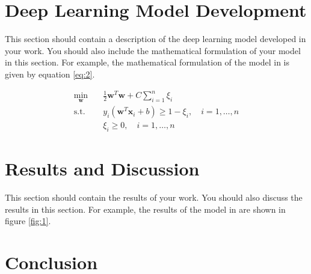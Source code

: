 \documentclass[lettersize, journal]{IEEEtran}
\begin{document}
\section[short]{Deep Learning Model Development}
\label{sec:dl_model}
This section should contain a description of the deep learning model developed in your work. You should also include the mathematical formulation of your model in this section. For example, the mathematical formulation of the model in \cite{ajao2020} is given by equation \ref{eq:2}.

\begin{equation}
    \label{eq:2}
    \begin{split}
        \min_{\mathbf{w}} \quad & \frac{1}{2} \mathbf{w}^T \mathbf{w} + C \sum_{i=1}^{n} \xi_i \\
        \text{s.t.} \quad & y_i(\mathbf{w}^T \mathbf{x}_i + b) \geq 1 - \xi_i, \quad i = 1, \dots, n \\
        & \xi_i \geq 0, \quad i = 1, \dots, n
    \end{split}
\end{equation}

\section{Results and Discussion}
\label{sec:results}
This section should contain the results of your work. You should also discuss the results in this section. For example, the results of the model in \cite{ajao2020} are shown in figure \ref{fig:1}.

\section{Conclusion}
\label{sec:conclusion}



\printbibliography
\end{document}
